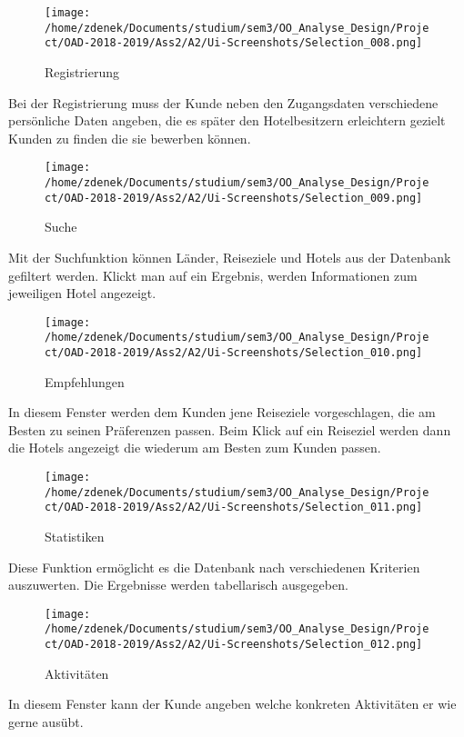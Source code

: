 \documentclass[a4paper]{article}
\begin{document}
\begin{figure}[h]
\centering
\caption{Registrierung}
\texttt{[image: /home/zdenek/Documents/studium/sem3/OO\_Analyse\_Design/Project/OAD-2018-2019/Ass2/A2/Ui-Screenshots/Selection\_008.png]}
\end{figure}

Bei der Registrierung muss der Kunde neben den Zugangsdaten verschiedene persönliche Daten angeben, die es später den Hotelbesitzern erleichtern gezielt Kunden zu finden die sie bewerben können.


\begin{figure}[h]
\centering
\caption{Suche}
\texttt{[image: /home/zdenek/Documents/studium/sem3/OO\_Analyse\_Design/Project/OAD-2018-2019/Ass2/A2/Ui-Screenshots/Selection\_009.png]}
\end{figure}

Mit der Suchfunktion können Länder, Reiseziele und Hotels aus der Datenbank gefiltert werden. Klickt man auf ein Ergebnis, werden Informationen zum jeweiligen Hotel angezeigt.


\begin{figure}[h]
\centering
\caption{Empfehlungen}
\texttt{[image: /home/zdenek/Documents/studium/sem3/OO\_Analyse\_Design/Project/OAD-2018-2019/Ass2/A2/Ui-Screenshots/Selection\_010.png]}
\end{figure}

In diesem Fenster werden dem Kunden jene Reiseziele vorgeschlagen, die am Besten zu seinen Präferenzen passen. Beim Klick auf ein Reiseziel werden dann die Hotels angezeigt die wiederum am Besten zum Kunden passen.

\begin{figure}[h]
\centering
\caption{Statistiken}
\texttt{[image: /home/zdenek/Documents/studium/sem3/OO\_Analyse\_Design/Project/OAD-2018-2019/Ass2/A2/Ui-Screenshots/Selection\_011.png]}
\end{figure}

Diese Funktion ermöglicht es die Datenbank nach verschiedenen Kriterien auszuwerten.
Die Ergebnisse werden tabellarisch ausgegeben.

\begin{figure}[h]
\centering
\caption{Aktivitäten}
\texttt{[image: /home/zdenek/Documents/studium/sem3/OO\_Analyse\_Design/Project/OAD-2018-2019/Ass2/A2/Ui-Screenshots/Selection\_012.png]}
\end{figure}

In diesem Fenster kann der Kunde angeben welche konkreten Aktivitäten er wie gerne ausübt. 
\end{document}
